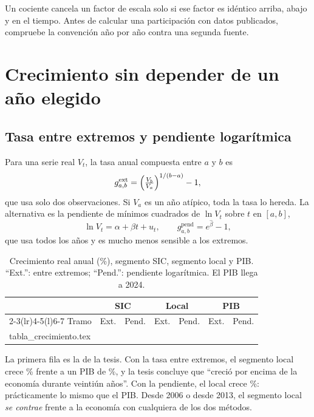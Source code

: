 \documentclass[11pt,letterpaper]{article}
\makeatletter
\newcommand{\tablainput}[1]{\@@input #1.tex }
\theoremstyle{definition}
\theoremstyle{plain}
\makeatother
\begin{document}
\begin{leccion}
Un cociente cancela un factor de escala solo si ese factor es idéntico arriba, abajo y en el tiempo. Antes de calcular una participación con datos publicados, compruebe la convención año por año contra una segunda fuente.
\end{leccion}

\section{Crecimiento sin depender de un año elegido}

\subsection{Tasa entre extremos y pendiente logarítmica}
Para una serie real $V_t$, la tasa anual compuesta entre $a$ y $b$ es
\[
g^{\mathrm{ext}}_{a,b}=\Bigl(\tfrac{V_b}{V_a}\Bigr)^{1/(b-a)}-1,
\]
que usa solo dos observaciones. Si $V_a$ es un año atípico, toda la tasa lo hereda. La alternativa es la pendiente de mínimos cuadrados de $\ln V_t$ sobre $t$ en $[a,b]$,
\[
\ln V_t=\alpha+\beta t+u_t,\qquad g^{\mathrm{pend}}_{a,b}=e^{\hat\beta}-1,
\]
que usa todos los años y es mucho menos sensible a los extremos.

\begin{table}[h]\centering\small
\caption{Crecimiento real anual (\%), segmento SIC, segmento local y PIB. ``Ext.'': entre extremos; ``Pend.'': pendiente logarítmica. El PIB llega a 2024.}
\begin{tabular}{@{}lrrrrrr@{}}\toprule
& \multicolumn{2}{c}{SIC} & \multicolumn{2}{c}{Local} & \multicolumn{2}{c}{PIB}\\
\cmidrule(lr){2-3}\cmidrule(lr){4-5}\cmidrule(l){6-7}
Tramo & Ext. & Pend. & Ext. & Pend. & Ext. & Pend.\\\midrule
\tablainput{tabla_crecimiento}
\bottomrule\end{tabular}
\end{table}

La primera fila es la de la tesis. Con la tasa entre extremos, el segmento local crece \RlocExt\% frente a un PIB de \RpibExt\%, y la tesis concluye que ``creció por encima de la economía durante veintiún años''. Con la pendiente, el local crece \RlocPend\%: prácticamente lo mismo que el PIB. Desde 2006 o desde 2013, el segmento local \emph{se contrae} frente a la economía con cualquiera de los dos métodos.
\end{document}
